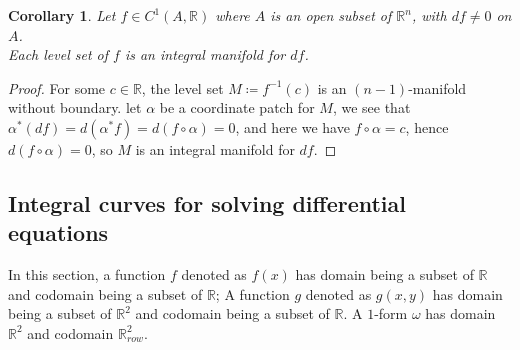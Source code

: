 \documentclass[15pt]{book}
\theoremstyle{break}
\theoremstyle{break}
\newtheorem{corL}{Corollary}[lem]
\newcommand{\R}{\mathbb{R}}
\begin{document}
\begin{corL}
Let $f \in C^1(A,\R)$ where $A$ is an open subset of $\R^n$, with $df \neq 0$ on $A$.\\
Each level set of $f$ is an integral manifold for $df$.
\end{corL}
\begin{proof}
For some $c \in \R$, the level set $M \coloneqq f^{-1}(c)$ is an $(n-1)$-manifold without boundary. let $\alpha$ be a coordinate patch for $M$, we see that $\alpha^*(df) = d(\alpha^* f) = d(f\circ \alpha) = 0$, and here we have $f\circ \alpha = c$, hence $d(f\circ \alpha) = 0$, so $M$ is an integral manifold for $df$. 
\end{proof}

\subsection*{Integral curves for solving differential equations}
In this section, a function $f$ denoted as $f(x)$ has domain being a subset of $\R$ and codomain being a subset of $\R$; A function $g$ denoted as $g(x,y)$ has domain being a subset of $\R^2$ and codomain being a subset of $\R$. A $1$-form $\omega$ has domain $\R^2$ and codomain $\R^2_{row}$.\\
\end{document}
